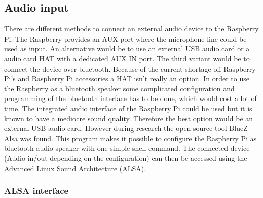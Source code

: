 \subsection{Audio input}\label{sec:software:rec}
%
There are different methods to connect an external audio device to the Raspberry Pi. The Raspberry provides an AUX port where the microphone line could be used as input. An alternative would be to use an external USB audio card or a audio card HAT with a dedicated AUX IN port. The third variant would be to connect the device over bluetooth.\p
%
Because of the current shortage off Raspberry Pi's and Raspberry Pi accessories a HAT isn't really an option. In order to use the Raspberry as a bluetooth speaker some complicated configuration and programming of the bluetooth interface has to be done, which would cost a lot of time. The integrated audio interface of the Raspberry Pi could be used but it is known to have a mediocre sound quality. Therefore the best option would be an external USB audio card. However during research the open source tool BlueZ-Alsa\cite{bokowy_bluez-alsa_2022} was found. This program makes it possible to configure the Raspberry Pi as bluetooth audio speaker with one simple shell-command. The connected device (Audio in/out depending on the configuration) can then be accessed using the Advanced Linux Sound Architecture (ALSA).
%
\subsubsection*{ALSA interface}

